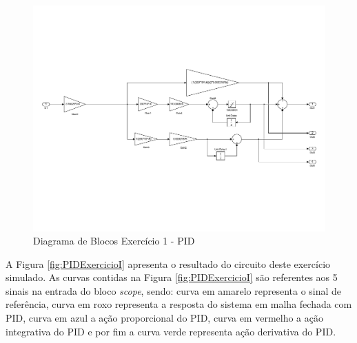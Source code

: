 	\begin{figure}[H]
		\centering
		\includegraphics[scale = .6]{Imagens/Exercicio1_PID_Simulink.pdf}
		\caption{Diagrama de Blocos Exercício 1 - PID}
		\label{fig:Exercicio1_PID_Simulink}
	\end{figure}
	
	A Figura \ref{fig:PIDExercicioI} apresenta o resultado do circuito deste exercício simulado. As curvas contidas na Figura \ref{fig:PIDExercicioI} são referentes aos 5 sinais na entrada do bloco \emph{scope}, sendo: curva em amarelo representa o sinal de referência, curva em roxo representa a  resposta do sistema em malha fechada com PID, curva em azul a ação proporcional do PID, curva em vermelho a ação integrativa do PID e por fim a curva verde representa ação derivativa do PID.
	
